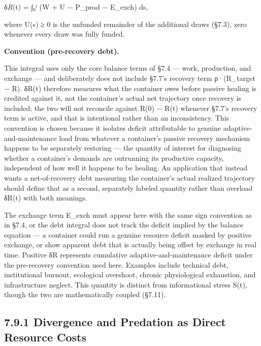 \documentclass[
]{article}
\begin{document}
δ\emph{R}(t) = ∫₀ᵗ (W + U − P\_prod − E\_exch) ds,

where U(s) ≥ 0 is the unfunded remainder of the additional draws (§7.3),
zero whenever every draw was fully funded.

\textbf{Convention (pre-recovery debt).}

This integral uses only the core balance terms of §7.4 --- work,
production, and exchange --- and deliberately does not include §7.7's
recovery term ρ·(R\_target − R). δR(t) therefore measures what the
container owes before passive healing is credited against it, not the
container's actual net trajectory once recovery is included; the two
will not reconcile against R(0) − R(t) whenever §7.7's recovery term is
active, and that is intentional rather than an inconsistency. This
convention is chosen because it isolates deficit attributable to genuine
adaptive-and-maintenance load from whatever a container's passive
recovery mechanism happens to be separately restoring --- the quantity
of interest for diagnosing whether a container's demands are outrunning
its productive capacity, independent of how well it happens to be
healing. An application that instead wants a net-of-recovery debt
measuring the container's actual realized trajectory should define that
as a second, separately labeled quantity rather than overload δR(t) with
both meanings.

The exchange term E\_exch must appear here with the same sign convention
as in §7.4, or the debt integral does not track the deficit implied by
the balance equation --- a container could run a genuine resource
deficit masked by positive exchange, or show apparent debt that is
actually being offset by exchange in real time. Positive δR represents
cumulative adaptive-and-maintenance deficit under the pre-recovery
convention used here. Examples include technical debt, institutional
burnout, ecological overshoot, chronic physiological exhaustion, and
infrastructure neglect. This quantity is distinct from informational
stress S(t), though the two are mathematically coupled (§7.11).

\hypertarget{divergence-and-predation-as-direct-resource-costs}{%
\subsection{7.9.1 Divergence and Predation as Direct Resource
Costs}\label{divergence-and-predation-as-direct-resource-costs}}
\end{document}
